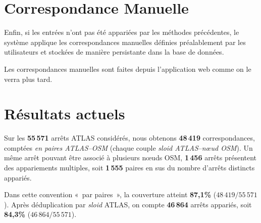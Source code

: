 \section{Correspondance Manuelle}

Enfin, si les entrées n'ont pas été appariées par les méthodes précédentes, le système applique les correspondances manuelles définies préalablement par les utilisateurs et stockées de manière persistante dans la base de données. 

Les correspondances manuelles sont faites depuis l'application web comme on le verra plus tard.

\section{Résultats actuels}

Sur les \textbf{55\,571} arrêts ATLAS considérés, nous obtenons \textbf{48\,419} correspondances, comptées \emph{en paires ATLAS--OSM} (chaque couple \textit{sloid ATLAS}--\textit{nœud OSM}). Un même arrêt pouvant être associé à plusieurs nœuds OSM, \textbf{1\,456} arrêts présentent des appariements multiples, soit \textbf{1\,555} paires en sus du nombre d'arrêts distincts appariés.

Dans cette convention «\ par paires\ », la couverture atteint \textbf{87,1\%} (\(48\,419/55\,571\)). Après déduplication par \textit{sloid} ATLAS, on compte \textbf{46\,864} arrêts appariés, soit \textbf{84,3\%} (\(46\,864/55\,571\)).

\newline

